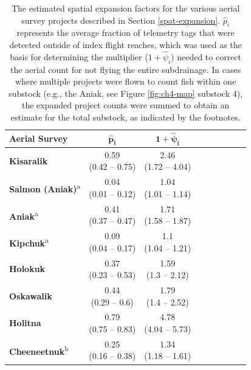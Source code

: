 \documentclass[12pt,]{book}
\theoremstyle{definition}
\theoremstyle{definition}
\theoremstyle{definition}
\theoremstyle{remark}
\begin{document}
\begin{table}

\caption{\label{tab:spat-expand-table}The estimated spatial expansion factors for the various aerial survey projects described in Section \ref{spat-expansion}. $\hat{p}_i$ represents the average fraction of telemetry tags that were detected outside of index flight reaches, which was used as the basis for determining the multiplier ($1 + \hat{\psi}_i$) needed to correct the aerial count for not flying the entire subdrainage. In cases where multiple projects were flown to count fish within one substock (e.g., the Aniak, see Figure \ref{fig:ch4-map} substock 4), the expanded project counts were summed to obtain an estimate for the total substock, as indicated by the footnotes.}
\centering
\begin{tabular}[t]{lcclcclcc}
\toprule
\textbf{Aerial Survey} & $\boldsymbol{\hat{p}_i}$ & $\boldsymbol{1 + \hat{\psi}_i}$\\
\midrule
\textbf{Kisaralik} & \makecell[c]{0.59\\(0.42 -- 0.75)} & \makecell[c]{2.46\\(1.72 -- 4.04)}\\
\textbf{Salmon (Aniak)}\textsuperscript{a} & \makecell[c]{0.04\\(0.01 -- 0.12)} & \makecell[c]{1.04\\(1.01 -- 1.14)}\\
\textbf{Aniak}\textsuperscript{a} & \makecell[c]{0.41\\(0.37 -- 0.47)} & \makecell[c]{1.71\\(1.58 -- 1.87)}\\
\textbf{Kipchuk}\textsuperscript{a} & \makecell[c]{0.09\\(0.04 -- 0.17)} & \makecell[c]{1.1\\(1.04 -- 1.21)}\\
\textbf{Holokuk} & \makecell[c]{0.37\\(0.23 -- 0.53)} & \makecell[c]{1.59\\(1.3 -- 2.12)}\\
\textbf{Oskawalik} & \makecell[c]{0.44\\(0.29 -- 0.6)} & \makecell[c]{1.79\\(1.4 -- 2.52)}\\
\textbf{Holitna} & \makecell[c]{0.79\\(0.75 -- 0.83)} & \makecell[c]{4.78\\(4.04 -- 5.73)}\\
\textbf{Cheeneetnuk}\textsuperscript{b} & \makecell[c]{0.25\\(0.16 -- 0.38)} & \makecell[c]{1.34\\(1.18 -- 1.61)}\\

\end{tabular}
\end{table}
\end{document}
